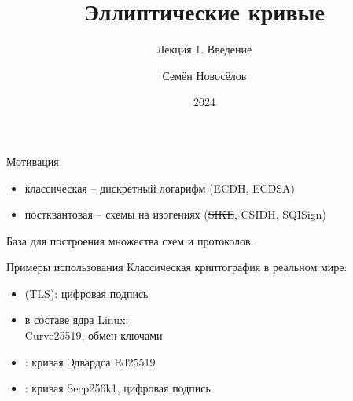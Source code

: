 \documentclass{beamer}
\title{Эллиптические кривые}
\subtitle{Лекция 1. Введение}
\author{Семён Новосёлов}
\institute{БФУ им. И. Канта}
\date{2024}
\begin{document}
    

\frame{\titlepage}

\begin{frame}{Мотивация}

    \begin{itemize}
        \item классическая -- дискретный логарифм (ECDH, ECDSA)
        \item постквантовая -- схемы на изогениях (\sout{SIKE}, CSIDH, SQISign)
    \end{itemize}
    
    База для построения множества схем и протоколов.
\end{frame}

\begin{frame}{Примеры использования}
Классическая криптография в реальном мире:
\vspace{0.5em}
\begin{itemize}
	\item {} (TLS): цифровая подпись
	\item {} в составе ядра Linux:
	\\Curve25519, обмен ключами
	\item {}: кривая Эдвардса Ed25519
	\item {}: кривая Secp256k1, цифровая подпись
\end{itemize}
\end{frame}
\end{document}
